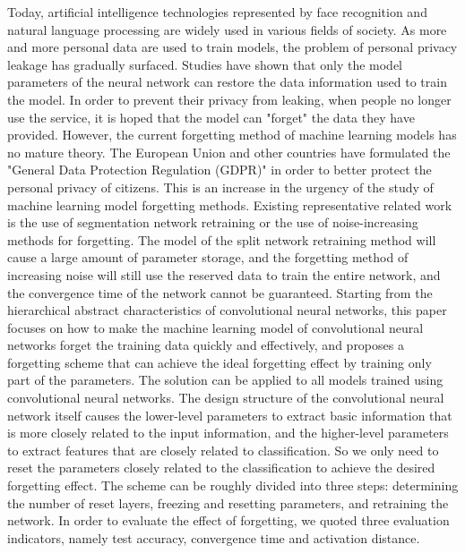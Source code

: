 \begin{abstract*}
  Today, artificial intelligence technologies represented by face recognition and natural language processing are widely used in various fields of society. 
  As more and more personal data are used to train models, the problem of personal privacy leakage has gradually surfaced.
  Studies\cite{10.5555/3241094.3241142,Fredrikson2015} have shown that only the model parameters of the neural network can restore the data information used to train the model.
  In order to prevent their privacy from leaking, when people no longer use the service, it is hoped that the model can "forget" the data they have provided. 
  However, the current forgetting method of machine learning models has no mature theory.
  The European Union and other countries have formulated the "General Data Protection Regulation (GDPR)" in order to better protect the personal privacy of citizens. 
  This is an increase in the urgency of the study of machine learning model forgetting methods.
  Existing representative related work is the use of segmentation network retraining or the use of noise-increasing methods for forgetting. 
  The model of the split network retraining method will cause a large amount of parameter storage, and the forgetting method of increasing noise will still use the reserved data to train the entire network, 
  and the convergence time of the network cannot be guaranteed.
  Starting from the hierarchical abstract characteristics of convolutional neural networks, 
  this paper focuses on how to make the machine learning model of convolutional neural networks forget the training data quickly and effectively, 
  and proposes a forgetting scheme that can achieve the ideal forgetting effect by training only part of the parameters. 
  The solution can be applied to all models trained using convolutional neural networks.
  The design structure of the convolutional neural network itself causes the lower-level parameters to extract basic information that is more closely related to the input information, 
  and the higher-level parameters to extract features that are closely related to classification.
  So we only need to reset the parameters closely related to the classification to achieve the desired forgetting effect.
  The scheme can be roughly divided into three steps: determining the number of reset layers, freezing and resetting parameters, and retraining the network. 
  In order to evaluate the effect of forgetting, we quoted three evaluation indicators, namely test accuracy, convergence time and activation distance.
  

\end{abstract*}
